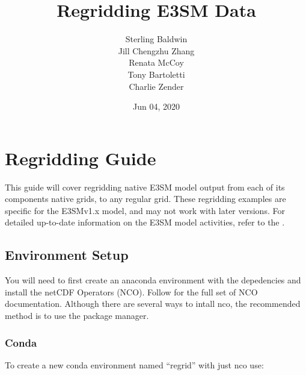 \documentclass[letterpaper,10pt,english]{sphinxmanual}
\title{Regridding E3SM Data}
\date{Jun 04, 2020}
\author{Sterling Baldwin \\ Jill Chengzhu Zhang \\ Renata McCoy \\ Tony Bartoletti \\ Charlie Zender}
\begin{document}
\pagestyle{empty}
\sphinxmaketitle
\pagestyle{plain}
\sphinxtableofcontents
\pagestyle{normal}
\label{\detokenize{index::doc}}



\chapter{Regridding Guide}
\label{\detokenize{guide:regridding-guide}}\label{\detokenize{guide:guide}}\label{\detokenize{guide::doc}}
This guide will cover regridding native E3SM model output from each of its components native grids, to
any regular grid. These regridding examples are specific for the E3SMv1.x model, and may not work with later versions. For detailed up-to-date information on the
E3SM model activities, refer to the .


\section{Environment Setup}
\label{\detokenize{guide:environment-setup}}
You will need to first create an anaconda environment with the depedencies and install the netCDF Operators (NCO).
Follow  for the full set of NCO documentation.
Although there are several ways to intall nco, the recommended method is to use the  package manager.


\subsection{Conda}
\label{\detokenize{guide:id1}}
\begin{sphinxVerbatim}[commandchars=\\\{\}]
    
\end{sphinxVerbatim}

To create a new conda environment named “regrid” with just nco use:

\begin{sphinxVerbatim}[commandchars=\\\{\}]
      
\end{sphinxVerbatim}
\end{document}
